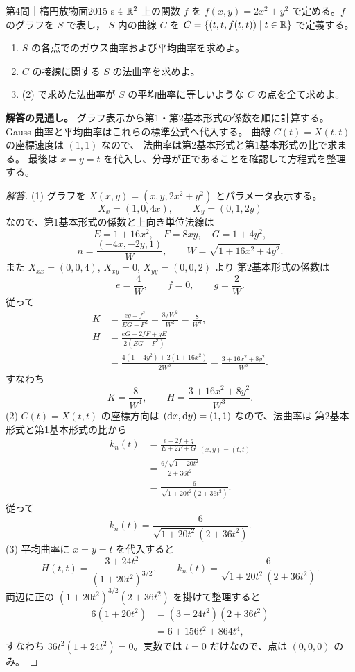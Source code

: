 \begin{problem}{第4問｜楕円放物面}{2015-s-4}
$\mathbb{R}^2$ 上の関数 $f$ を $f(x,y)=2x^2+y^2$ で定める。$f$ のグラフを $S$ で表し，
$S$ 内の曲線 $C$ を $C=\{(t,t,f(t,t))\mid t\in\mathbb{R}\}$ で定義する。
\begin{enumerate}
  \item[(1)] $S$ の各点でのガウス曲率および平均曲率を求めよ。
  \item[(2)] $C$ の接線に関する $S$ の法曲率を求めよ。
  \item[(3)] (2) で求めた法曲率が $S$ の平均曲率に等しいような $C$ の点を全て求めよ。
\end{enumerate}
\end{problem}
\begin{memo*}
\textbf{解答の見通し。}
グラフ表示から第1・第2基本形式の係数を順に計算する。
Gauss 曲率と平均曲率はこれらの標準公式へ代入する。
曲線 $C(t)=X(t,t)$ の座標速度は $(1,1)$ なので、
法曲率は第2基本形式と第1基本形式の比で求まる。
最後は $x=y=t$ を代入し、分母が正であることを確認して方程式を整理する。
\end{memo*}
\begin{proof}[解答]
(1) グラフを $X(x,y)=(x,y,2x^2+y^2)$ とパラメータ表示する。
\[
X_x=(1,0,4x),\qquad X_y=(0,1,2y)
\]
なので、第1基本形式の係数と上向き単位法線は
\[
E=1+16x^2,\quad F=8xy,\quad G=1+4y^2,
\]
\[
n=\frac{(-4x,-2y,1)}W,\qquad W=\sqrt{1+16x^2+4y^2}.
\]
また $X_{xx}=(0,0,4)$, $X_{xy}=0$, $X_{yy}=(0,0,2)$ より
第2基本形式の係数は
\[
e=\frac4W,\qquad f=0,\qquad g=\frac2W.
\]
従って
\begin{align*}
K&=\frac{eg-f^2}{EG-F^2}
=\frac{8/W^2}{W^2}=\frac8{W^4},\\
H&=\frac{eG-2fF+gE}{2(EG-F^2)}\\
&=\frac{4(1+4y^2)+2(1+16x^2)}{2W^3}
=\frac{3+16x^2+8y^2}{W^3}.
\end{align*}
すなわち
\[
K=\frac8{W^4},\qquad H=\frac{3+16x^2+8y^2}{W^3}.
\]
(2) $C(t)=X(t,t)$ の座標方向は $(\mathrm{d} x,\mathrm{d} y)=(1,1)$ なので、法曲率は
第2基本形式と第1基本形式の比から
\begin{align*}
k_n(t)
&=\frac{e+2f+g}{E+2F+G}\bigg|_{(x,y)=(t,t)}\\
&=\frac{6/\sqrt{1+20t^2}}{2+36t^2}\\
&=\frac6{\sqrt{1+20t^2}(2+36t^2)}.
\end{align*}
従って
\[
k_n(t)=\frac6{\sqrt{1+20t^2}(2+36t^2)}.
\]
(3) 平均曲率に $x=y=t$ を代入すると
\[
H(t,t)=\frac{3+24t^2}{(1+20t^2)^{3/2}},\qquad
k_n(t)=\frac6{\sqrt{1+20t^2}(2+36t^2)}.
\]
両辺に正の $(1+20t^2)^{3/2}(2+36t^2)$ を掛けて整理すると
\begin{align*}
6(1+20t^2)&=(3+24t^2)(2+36t^2)\\
&=6+156t^2+864t^4,
\end{align*}
すなわち $36t^2(1+24t^2)=0$。実数では $t=0$ だけなので、点は $(0,0,0)$ のみ。
\end{proof}

